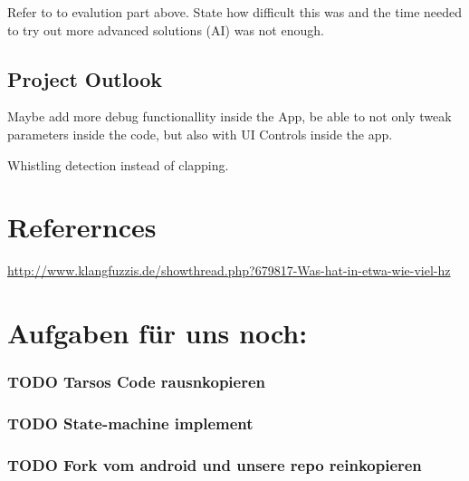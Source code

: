 \documentclass
[
 12pt, %
       DIV12,
       a4paper,
       oneside,
       titlepage,
       parskip=half,
       headings=normal,
       listof=totoc,
       bibliography=totoc,
       index=totoc,
       captions=tableheading,
       ]{scrreprt}
\begin{document}
Refer to to evalution part above. State how difficult this was and the time
needed to try out more advanced solutions (AI) was not enough.

\section{Project Outlook}
\label{sec:orgfa9fd4b}
Maybe add more debug functionallity inside the App, be able to not only tweak
parameters inside the code, but also with UI Controls inside the app.

Whistling detection instead of clapping.







\chapter{Referernces}
\label{sec:orgb5557bc}
\url{http://www.klangfuzzis.de/showthread.php?679817-Was-hat-in-etwa-wie-viel-hz}

\chapter{Aufgaben für uns noch:}
\label{sec:org5420eeb}
\subsection{{\bfseries\sffamily TODO} Tarsos Code rausnkopieren}
\label{sec:org962ce9e}
\subsection{{\bfseries\sffamily TODO} State-machine implement}
\label{sec:org5263181}
\subsection{{\bfseries\sffamily TODO} Fork vom android und unsere repo reinkopieren}
\label{sec:orge187f87}
\end{document}
